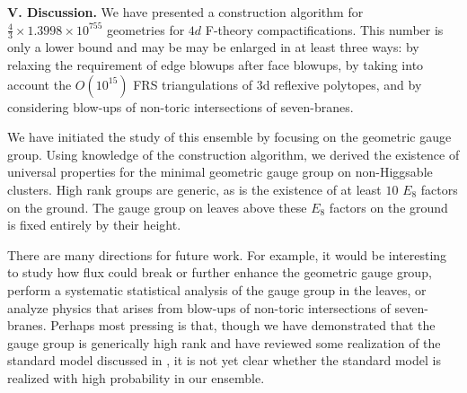 \documentclass[aps,prl,twocolumn, superscriptaddress,groupedaddress,nofootinbib]{revtex4-1}
\begin{document}
\vspace{.2cm}
\noindent \textbf{V. Discussion.} 
We have presented a construction algorithm for  $\frac43 \times 1.3998\times
10^{755}$ geometries for $4d$ F-theory compactifications. This number is only
a lower bound and may be may be enlarged in at least three ways: by relaxing
the requirement of edge blowups after  face blowups, by taking into account
the $O(10^{15})$ FRS triangulations of 3d reflexive polytopes, and by
considering blow-ups of non-toric intersections of seven-branes.

We have initiated the study of this ensemble by focusing on the geometric gauge group.
Using knowledge of the construction algorithm, we derived the existence of universal
properties for the minimal geometric gauge group on non-Higgsable clusters. High
rank groups are generic, as is the existence of at least $10$ $E_8$ factors on the ground.
The gauge group on leaves above these $E_8$ factors on the ground is fixed entirely by their height.

There are many directions for future work. For example, it would be
interesting to study how flux could break or further enhance the geometric gauge group,
perform a systematic statistical analysis of the gauge group in the leaves, or analyze
physics that arises from blow-ups of non-toric intersections of seven-branes. 
Perhaps most pressing is that, though we have demonstrated that the gauge group is generically 
high rank and have reviewed some realization of the standard model discussed in \cite{Grassi:2014zxa}, it is not yet clear whether the standard model is realized with high probability in our ensemble.

\end{document}
